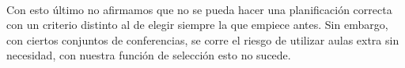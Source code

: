\documentclass{article}
\begin{document}
	\
	
	Con esto último no afirmamos que no se pueda hacer una planificación correcta con un criterio distinto al de elegir siempre la que empiece antes. Sin embargo, con ciertos conjuntos de conferencias, se corre el riesgo de utilizar aulas extra sin necesidad, con nuestra función de selección esto no sucede.
	
\end{document}
